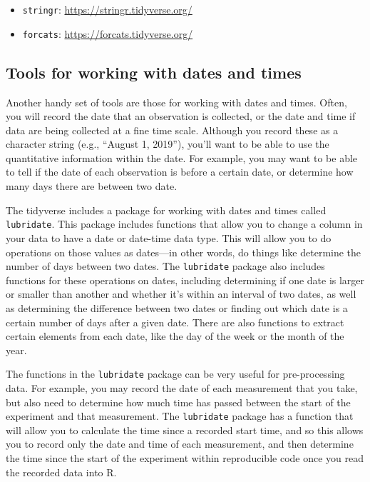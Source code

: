 \documentclass[]{tufte-book}
\providecommand{\tightlist}{%
  \setlength{\itemsep}{0pt}\setlength{\parskip}{0pt}}
\begin{document}
\begin{itemize}
\tightlist
\item
  \texttt{stringr}: \url{https://stringr.tidyverse.org/}
\item
  \texttt{forcats}: \url{https://forcats.tidyverse.org/}
\end{itemize}

\subsection{Tools for working with dates and times}\label{tools-for-working-with-dates-and-times}

Another handy set of tools are those for working with dates and times. Often, you
will record the date that an observation is collected, or the date and time if
data are being collected at a fine time scale. Although you record these as a
character string (e.g., ``August 1, 2019''), you'll want to be able to use the
quantitative information within the date. For example, you may want to be able
to tell if the date of each observation is before a certain date, or determine
how many days there are between two date.

The tidyverse includes a package for working with dates and times called
\texttt{lubridate}. This package includes functions that allow you to change a column
in your data to have a date or date-time data type. This will allow you to
do operations on those values as dates---in other words, do things like determine
the number of days between two dates. The \texttt{lubridate} package also includes
functions for these operations on dates, including determining if one date is
larger or smaller than another and whether it's within an interval of two dates,
as well as determining the difference between two dates or finding out which
date is a certain number of days after a given date. There are also functions
to extract certain elements from each date, like the day of the week or the
month of the year.

The functions in the \texttt{lubridate} package can be very useful for pre-processing
data. For example, you may record the date of each measurement that you take,
but also need to determine how much time has passed between the start of the
experiment and that measurement. The \texttt{lubridate} package has a function that
will allow you to calculate the time since a recorded start time, and so this
allows you to record only the date and time of each measurement, and then
determine the time since the start of the experiment within reproducible code
once you read the recorded data into R.
\end{document}
